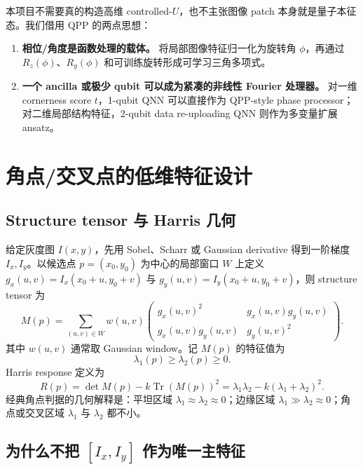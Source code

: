 \documentclass[UTF8,zihao=-4]{ctexart}
\newcommand{\Tr}{\operatorname{Tr}}
\begin{document}
本项目不需要真的构造高维 controlled-$U$，也不主张图像 patch 本身就是量子本征态。我们借用 QPP 的两点思想：
\begin{enumerate}[leftmargin=2.0em]
    \item \textbf{相位/角度是函数处理的载体。} 将局部图像特征归一化为旋转角 $\phi$，再通过 $R_z(\phi)$、$R_y(\phi)$ 和可训练旋转形成可学习三角多项式。
    \item \textbf{一个 ancilla 或极少 qubit 可以成为紧凑的非线性 Fourier 处理器。} 对一维 cornerness score $t$，1-qubit QNN 可以直接作为 QPP-style phase processor；对二维局部结构特征，2-qubit data re-uploading QNN 则作为多变量扩展 ansatz。
\end{enumerate}

\section{角点/交叉点的低维特征设计}

\subsection{Structure tensor 与 Harris 几何}

给定灰度图 $I(x,y)$，先用 Sobel、Scharr 或 Gaussian derivative 得到一阶梯度 $I_x,I_y$。以候选点 $p=(x_0,y_0)$ 为中心的局部窗口 $W$ 上定义
$g_x(u,v)=I_x(x_0+u,y_0+v)$ 与 $g_y(u,v)=I_y(x_0+u,y_0+v)$，则 structure tensor 为
\begin{equation}
M(p)=\sum_{(u,v)\in W} w(u,v)
\begin{pmatrix}
g_x(u,v)^2 & g_x(u,v)g_y(u,v)\\
g_x(u,v)g_y(u,v) & g_y(u,v)^2
\end{pmatrix}.
\end{equation}
其中 $w(u,v)$ 通常取 Gaussian window。记 $M(p)$ 的特征值为
\begin{equation}
    \lambda_1(p)\ge \lambda_2(p)\ge 0.
\end{equation}
Harris response 定义为
\begin{equation}
    R(p)=\det M(p)-k\Tr(M(p))^2
    =\lambda_1\lambda_2-k(\lambda_1+\lambda_2)^2.
\end{equation}
经典角点判据的几何解释是：平坦区域 $\lambda_1\approx\lambda_2\approx 0$；边缘区域 $\lambda_1\gg\lambda_2\approx0$；角点或交叉区域 $\lambda_1$ 与 $\lambda_2$ 都不小。

\subsection{为什么不把 $[I_x,I_y]$ 作为唯一主特征}
\end{document}
